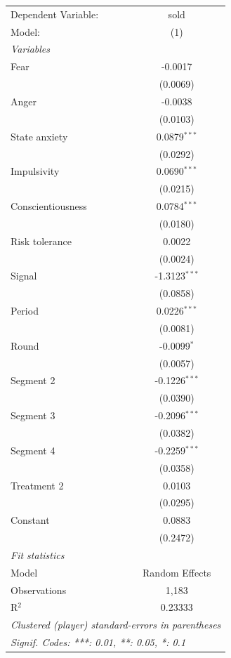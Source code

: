 
\begingroup
\centering
\scriptsize
\begin{tabular}{lc}
   \tabularnewline \midrule \midrule
   Dependent Variable: & sold\\
   Model:              & (1)\\
   \midrule
   \emph{Variables}\\
   Fear                & -0.0017\\
                       & (0.0069)\\
   Anger               & -0.0038\\
                       & (0.0103)\\
   State anxiety       & 0.0879$^{***}$\\
                       & (0.0292)\\
   Impulsivity         & 0.0690$^{***}$\\
                       & (0.0215)\\
   Conscientiousness   & 0.0784$^{***}$\\
                       & (0.0180)\\
   Risk tolerance      & 0.0022\\
                       & (0.0024)\\
   Signal              & -1.3123$^{***}$\\
                       & (0.0858)\\
   Period              & 0.0226$^{***}$\\
                       & (0.0081)\\
   Round               & -0.0099$^{*}$\\
                       & (0.0057)\\
   Segment 2           & -0.1226$^{***}$\\
                       & (0.0390)\\
   Segment 3           & -0.2096$^{***}$\\
                       & (0.0382)\\
   Segment 4           & -0.2259$^{***}$\\
                       & (0.0358)\\
   Treatment 2         & 0.0103\\
                       & (0.0295)\\
   Constant            & 0.0883\\
                       & (0.2472)\\
   \midrule
   \emph{Fit statistics}\\
   Model              & Random Effects\\
   Observations       & 1,183\\
   R$^2$              & 0.23333\\
   \midrule \midrule
   \multicolumn{2}{l}{\emph{Clustered (player) standard-errors in parentheses}}\\
   \multicolumn{2}{l}{\emph{Signif. Codes: ***: 0.01, **: 0.05, *: 0.1}}\\
\end{tabular}
\par\endgroup


